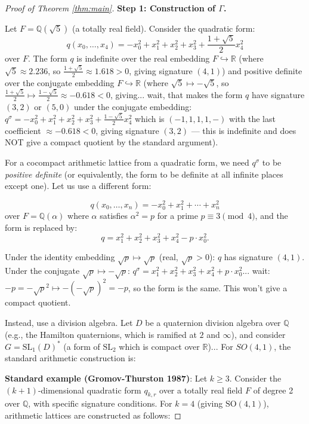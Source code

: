 \documentclass[12pt]{article}
\theoremstyle{definition}
\begin{document}
\begin{proof}[Proof of Theorem \ref{thm:main}]

\textbf{Step 1: Construction of $\Gamma$.}

Let $F = \mathbb{Q}(\sqrt{5})$ (a totally real field). Consider the quadratic form:
$$q(x_0,\ldots,x_4) = -x_0^2 + x_1^2+x_2^2+x_3^2+\frac{1+\sqrt{5}}{2}x_4^2$$
over $F$. The form $q$ is indefinite over the real embedding $F\hookrightarrow\mathbb{R}$ (where $\sqrt{5}\approx 2.236$, so $\frac{1+\sqrt{5}}{2}\approx 1.618 > 0$, giving signature $(4,1)$) and positive definite over the conjugate embedding $F\hookrightarrow\mathbb{R}$ (where $\sqrt{5}\mapsto -\sqrt{5}$, so $\frac{1+\sqrt{5}}{2}\mapsto\frac{1-\sqrt{5}}{2}\approx -0.618 < 0$, giving... wait, that makes the form $q$ have signature $(3,2)$ or $(5,0)$ under the conjugate embedding: $q^\sigma = -x_0^2+x_1^2+x_2^2+x_3^2 + \frac{1-\sqrt{5}}{2}x_4^2$ which is $(-1,1,1,1,-)$ with the last coefficient $\approx -0.618 < 0$, giving signature $(3,2)$ — this is indefinite and does NOT give a compact quotient by the standard argument).

For a cocompact arithmetic lattice from a quadratic form, we need $q^\sigma$ to be \emph{positive definite} (or equivalently, the form to be definite at all infinite places except one). Let us use a different form:

$$q(x_0,\ldots,x_n) = -x_0^2 + x_1^2+\cdots+x_n^2$$
over $F = \mathbb{Q}(\alpha)$ where $\alpha$ satisfies $\alpha^2 = p$ for a prime $p\equiv 3\pmod{4}$, and the form is replaced by:
$$q = x_1^2+x_2^2+x_3^2+x_4^2 - p\cdot x_0^2.$$

Under the identity embedding $\sqrt{p}\mapsto\sqrt{p}$ (real, $\sqrt{p} > 0$): $q$ has signature $(4,1)$.
Under the conjugate $\sqrt{p}\mapsto -\sqrt{p}$: $q^\sigma = x_1^2+x_2^2+x_3^2+x_4^2+p\cdot x_0^2$... wait: $-p = -\sqrt{p}^2\mapsto -(-\sqrt{p})^2 = -p$, so the form is the same. This won't give a compact quotient.

Instead, use a division algebra. Let $D$ be a quaternion division algebra over $\mathbb{Q}$ (e.g., the Hamilton quaternions, which is ramified at $2$ and $\infty$), and consider $G = \mathrm{SL}_1(D)^*$ (a form of $\mathrm{SL}_2$ which is compact over $\mathbb{R}$)... For $SO(4,1)$, the standard arithmetic construction is:

\textbf{Standard example (Gromov-Thurston 1987)}: Let $k\geq 3$. Consider the $(k+1)$-dimensional quadratic form $q_{k,r}$ over a totally real field $F$ of degree 2 over $\mathbb{Q}$, with specific signature conditions. For $k=4$ (giving $\mathrm{SO}(4,1)$), arithmetic lattices are constructed as follows:


\end{proof}
\end{document}
